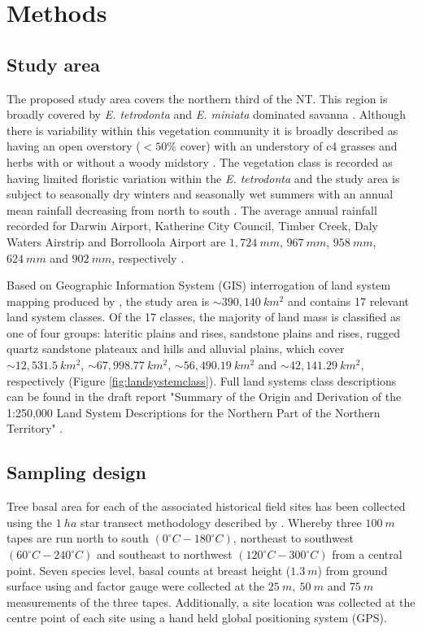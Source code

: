 \newpage

\section{Methods}
\subsection{Study area}
The proposed study area covers the northern third of the NT. This region is broadly covered by \emph{E. tetrodonta} and \emph{E. miniata} dominated savanna  \citep{foxetal2001, williams1996}. Although there is variability within this vegetation community it is broadly described as having an open overstory ($<50\%$ cover) with an understory of c4 grasses and herbs \citep{bondetal2005, bond2008, foxetal2001, williamsetal1997} with or without a woody midstory \citep{lehmannetal2011}. The vegetation class is recorded as having limited floristic variation within the \emph{E. tetrodonta} and the study area is subject to seasonally dry winters and seasonally wet summers with an annual mean rainfall decreasing from north to south \citep{williams1996}. The average annual rainfall recorded for Darwin Airport, Katherine City Council, Timber Creek, Daly Waters Airstrip and Borrolloola Airport are $1,724 \ mm$, $967 \ mm$, $958 \ mm$, $624 \ mm$  and $902 \ mm$, respectively \citep{bom2022}.
 
 Based on Geographic Information System (GIS) interrogation of land system mapping produced by \cite{lynchetal2012}, the study area is  $\sim390,140 \ km^{2}$ and contains 17 relevant land system classes. Of the 17 classes, the majority of land mass is classified as one of four groups: lateritic plains and rises, sandstone plains and rises, rugged quartz sandstone plateaux and hills and alluvial plains, which cover $\sim12,531.5 \ km^2$, $\sim67,998.77 \ km^2$, $\sim56,490.19 \ km^2$ and $\sim42,141.29 \ km^2$, respectively (Figure \ref{fig:landsystemclass}). Full land systems class descriptions can be found in the draft report "Summary of the Origin and Derivation of the 1:250,000 Land System Descriptions for the Northern Part of the Northern Territory" \citep{lynchetal2012}.
 
\subsection{Sampling design}
Tree basal area for each of the associated historical field sites has been collected using the $1 \ ha$ star transect methodology described by \cite{muiretal2011}. Whereby three $100 \ m$ tapes are run north to south $(0^{\circ}C - 180^{\circ}C)$, northeast to southwest $(60^{\circ}C - 240^{\circ}C)$ and southeast to northwest $(120^{\circ}C - 300^{\circ} C)$ from a central point. Seven species level, basal counts at breast height ($1.3 \ m$) from ground surface using and factor gauge were collected at the $25 \ m, \ 50 \ m$ and $75 \ m$ measurements of the three tapes. Additionally, a site location was collected at the centre point of each site using a hand held global positioning system (GPS).

